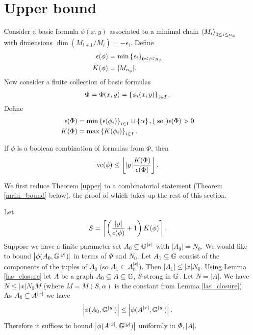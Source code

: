 \documentclass{amsart}
\begin{document}
\section{Upper bound}
Consider a basic formula $\phi(x,y)$ associated to a minimal chain  $\left\langle M_i \right\rangle_{0 \leq i \leq n_{\phi}}$ with dimensions  $\dim(M_{i+1}/M_i) = -\epsilon_i$.
Define
\begin{align*}
  \epsilon(\phi) &= \min \left\{\epsilon_i\right\}_{0 \leq i \leq n_\phi}\\
  K(\phi) &= |M_{n_\phi}|.
\end{align*}
Now consider a finite collection of basic formulas
\begin{align*}
  \Phi = \Phi( x, y) = \left\{\phi_i( x,  y)\right\}_{i\in I}.
\end{align*}
Define
\begin{align*}
  \epsilon(\Phi) &= \min \left\{\epsilon(\phi_i)\right\}_{i \in I} \cup \left\{\alpha\right\}, (\text{ so } ) \epsilon(\Phi) > 0\\
  K(\Phi) &= \max \left\{K(\phi_i)\right\}_{i \in I}.
\end{align*}
\begin{Theorem} \label{upper}
  If $\phi$ is a boolean combination of formulas from $\Phi$, then
  \begin{align*}
    \operatorname{vc}(\phi) \leq \left \lfloor |y|\frac{K(\Phi)}{\epsilon(\Phi)} \right \rfloor.    
  \end{align*}
\end{Theorem}
We first reduce Theorem \ref{upper} to a combinatorial statement (Theorem \ref{main_bound} below), the proof of which
takes up the rest of this section.

Let
\begin{align*}
  S = \left\lceil{\left(\frac{|y|}{\epsilon(\phi)} + 1\right) K(\phi)}\right\rceil.
\end{align*}
Suppose we have a finite parameter set $A_0 \subseteq \mathbb G^{|x|}$ with $|A_0| = N_0$.
We would like to bound $\left|\phi(A_0, \mathbb G^{|y|})\right|$ in terms of $\Phi$ and $N_0$.
Let $A_1 \subseteq \mathbb G$ consist of the components of the tuples of $A_0$ (so $A_1 \subset A_0^{|x|}$).
Then $|A_1| \leq |x| N_0$.
Using Lemma \ref{las_closure} let $A$ be a graph $A_0 \subseteq A \subseteq \mathbb G$, $S$-strong in $\mathbb G$.
Let $N = |A|$.
We have $N \leq |x| N_0 M$ (where $M = M(S, \alpha)$ is the constant from Lemma \ref{las_closure}).
As $A_0 \subseteq A^{|x|}$ we have
\begin{align*}
  \left|\phi(A_0, \mathbb G^{|y|})\right| \leq \left|\phi(A^{|x|}, \mathbb G^{|y|})\right|.
\end{align*}
Therefore it suffices to bound $\left|\phi(A^{|x|}, \mathbb G^{|y|})\right|$ uniformly in $\Phi, |A|$.
\end{document}
